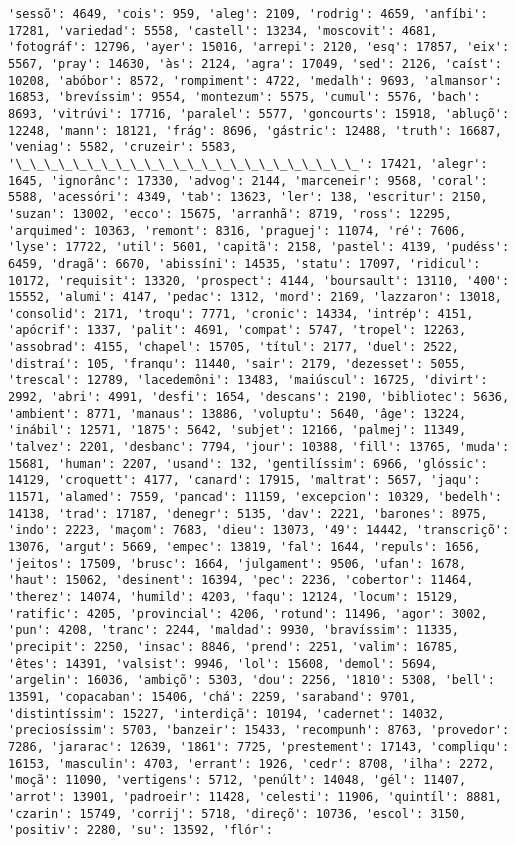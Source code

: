 \documentclass[11pt]{article}
\begin{document}
\begin{Verbatim}[commandchars=\\\{\}]
'sessõ': 4649, 'cois': 959, 'aleg': 2109, 'rodrig': 4659, 'anfíbi': 17281, 'variedad': 5558, 'castell': 13234, 'moscovit': 4681, 'fotográf': 12796, 'ayer': 15016, 'arrepi': 2120, 'esq': 17857, 'eix': 5567, 'pray': 14630, 'às': 2124, 'agra': 17049, 'sed': 2126, 'caíst': 10208, 'abóbor': 8572, 'rompiment': 4722, 'medalh': 9693, 'almansor': 16853, 'brevíssim': 9554, 'montezum': 5575, 'cumul': 5576, 'bach': 8693, 'vitrúvi': 17716, 'paralel': 5577, 'goncourts': 15918, 'abluçõ': 12248, 'mann': 18121, 'frág': 8696, 'gástric': 12488, 'truth': 16687, 'veniag': 5582, 'cruzeir': 5583, '\_\_\_\_\_\_\_\_\_\_\_\_\_\_\_\_\_\_\_\_\_\_\_\_': 17421, 'alegr': 1645, 'ignorânc': 17330, 'advog': 2144, 'marceneir': 9568, 'coral': 5588, 'acessóri': 4349, 'tab': 13623, 'ler': 138, 'escritur': 2150, 'suzan': 13002, 'ecco': 15675, 'arranhã': 8719, 'ross': 12295, 'arquimed': 10363, 'remont': 8316, 'praguej': 11074, 'ré': 7606, 'lyse': 17722, 'util': 5601, 'capitã': 2158, 'pastel': 4139, 'pudéss': 6459, 'dragã': 6670, 'abissíni': 14535, 'statu': 17097, 'ridicul': 10172, 'requisit': 13320, 'prospect': 4144, 'boursault': 13110, '400': 15552, 'alumi': 4147, 'pedac': 1312, 'mord': 2169, 'lazzaron': 13018, 'consolid': 2171, 'troqu': 7771, 'cronic': 14334, 'intrép': 4151, 'apócrif': 1337, 'palit': 4691, 'compat': 5747, 'tropel': 12263, 'assobrad': 4155, 'chapel': 15705, 'títul': 2177, 'duel': 2522, 'distraí': 105, 'franqu': 11440, 'sair': 2179, 'dezesset': 5055, 'trescal': 12789, 'lacedemôni': 13483, 'maiúscul': 16725, 'divirt': 2992, 'abri': 4991, 'desfi': 1654, 'descans': 2190, 'bibliotec': 5636, 'ambient': 8771, 'manaus': 13886, 'voluptu': 5640, 'âge': 13224, 'inábil': 12571, '1875': 5642, 'subjet': 12166, 'palmej': 11349, 'talvez': 2201, 'desbanc': 7794, 'jour': 10388, 'fill': 13765, 'muda': 15681, 'human': 2207, 'usand': 132, 'gentilíssim': 6966, 'glóssic': 14129, 'croquett': 4177, 'canard': 17915, 'maltrat': 5657, 'jaqu': 11571, 'alamed': 7559, 'pancad': 11159, 'excepcion': 10329, 'bedelh': 14138, 'trad': 17187, 'denegr': 5135, 'dav': 2221, 'barones': 8975, 'indo': 2223, 'maçom': 7683, 'dieu': 13073, '49': 14442, 'transcriçõ': 13076, 'argut': 5669, 'empec': 13819, 'fal': 1644, 'repuls': 1656, 'jeitos': 17509, 'brusc': 1664, 'julgament': 9506, 'ufan': 1678, 'haut': 15062, 'desinent': 16394, 'pec': 2236, 'cobertor': 11464, 'therez': 14074, 'humild': 4203, 'faqu': 12124, 'locum': 15129, 'ratific': 4205, 'provincial': 4206, 'rotund': 11496, 'agor': 3002, 'pun': 4208, 'tranc': 2244, 'maldad': 9930, 'bravíssim': 11335, 'precipit': 2250, 'insac': 8846, 'prend': 2251, 'valim': 16785, 'êtes': 14391, 'valsist': 9946, 'lol': 15608, 'demol': 5694, 'argelin': 16036, 'ambiçõ': 5303, 'dou': 2256, '1810': 5308, 'bell': 13591, 'copacaban': 15406, 'chá': 2259, 'saraband': 9701, 'distintíssim': 15227, 'interdiçã': 10194, 'cadernet': 14032, 'preciosíssim': 5703, 'banzeir': 15433, 'recompunh': 8763, 'provedor': 7286, 'jararac': 12639, '1861': 7725, 'prestement': 17143, 'compliqu': 16153, 'masculin': 4703, 'errant': 1926, 'cedr': 8708, 'ilha': 2272, 'moçã': 11090, 'vertigens': 5712, 'penúlt': 14048, 'gél': 11407, 'arrot': 13901, 'padroeir': 11428, 'celesti': 11906, 'quintíl': 8881, 'czarin': 15749, 'corrij': 5718, 'direçõ': 10736, 'escol': 3150, 'positiv': 2280, 'su': 13592, 'flór': 
\end{Verbatim}
\end{document}
